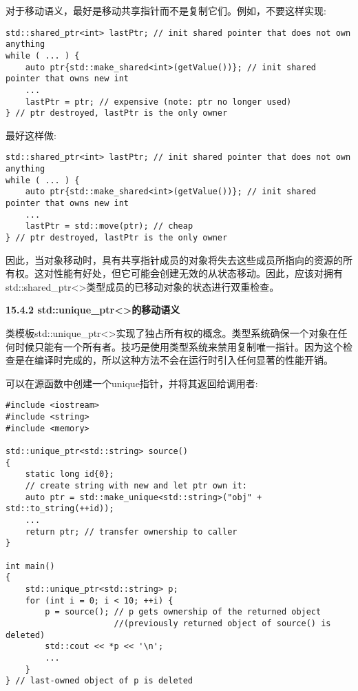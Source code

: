 对于移动语义，最好是移动共享指针而不是复制它们。例如，不要这样实现:\par

\begin{lstlisting}[caption={}]
std::shared_ptr<int> lastPtr; // init shared pointer that does not own anything
while ( ... ) {
	auto ptr{std::make_shared<int>(getValue())}; // init shared pointer that owns new int
	...
	lastPtr = ptr; // expensive (note: ptr no longer used)
} // ptr destroyed, lastPtr is the only owner
\end{lstlisting}

最好这样做:\par

\begin{lstlisting}[caption={}]
std::shared_ptr<int> lastPtr; // init shared pointer that does not own anything
while ( ... ) {
	auto ptr{std::make_shared<int>(getValue())}; // init shared pointer that owns new int
	...
	lastPtr = std::move(ptr); // cheap
} // ptr destroyed, lastPtr is the only owner
\end{lstlisting}

因此，当对象移动时，具有共享指针成员的对象将失去这些成员所指向的资源的所有权。这对性能有好处，但它可能会创建无效的从状态移动。因此，应该对拥有std::shared\_ptr<>类型成员的已移动对象的状态进行双重检查。\par

\hspace*{\fill} \par %
\textbf{15.4.2 std::unique\_ptr<>的移动语义}

类模板std::unique\_ptr<>实现了独占所有权的概念。类型系统确保一个对象在任何时候只能有一个所有者。技巧是使用类型系统来禁用复制唯一指针。因为这个检查是在编译时完成的，所以这种方法不会在运行时引入任何显著的性能开销。\par

可以在源函数中创建一个unique指针，并将其返回给调用者:\par

{\color{red}{lib/uniqueptr1.cpp}}\par

\begin{lstlisting}[caption={}]
#include <iostream>
#include <string>
#include <memory>

std::unique_ptr<std::string> source()
{
	static long id{0};
	// create string with new and let ptr own it:
	auto ptr = std::make_unique<std::string>("obj" + std::to_string(++id));
	...
	return ptr; // transfer ownership to caller
}

int main()
{
	std::unique_ptr<std::string> p;
	for (int i = 0; i < 10; ++i) {
		p = source(); // p gets ownership of the returned object
		              //(previously returned object of source() is deleted)
		std::cout << *p << '\n';
		...
	}
} // last-owned object of p is deleted
\end{lstlisting}

